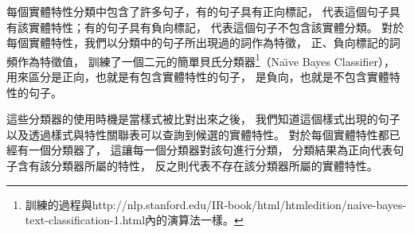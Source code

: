 每個實體特性分類中包含了許多句子，有的句子具有正向標記，
代表這個句子具有該實體特性；有的句子具有負向標記，
代表這個句子不包含該實體分類。
對於每個實體特性，我們以分類中的句子所出現過的詞作為特徵，
正、負向標記的詞頻作為特徵值，
訓練了一個二元的簡單貝氏分類器\footnote{訓練的過程與http://nlp.stanford.edu/IR-book/html/htmledition/naive-bayes-text-classification-1.html內的演算法一樣。}（Na\"{\i}ve Bayes Classifier），
用來區分是正向，也就是有包含實體特性的句子，
是負向，也就是不包含實體特性的句子。

這些分類器的使用時機是當樣式被比對出來之後，
我們知道這個樣式出現的句子以及透過樣式與特性關聯表可以查詢到候選的實體特性。
對於每個實體特性都已經有一個分類器了，
這讓每一個分類器對該句進行分類，
分類結果為正向代表句子含有該分類器所屬的特性，
反之則代表不存在該分類器所屬的實體特性。

